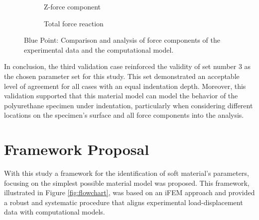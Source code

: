 \begin{figure}[htbp]
\begin{subfigure}[b]{0.45\textwidth}
    \caption{Z-force component}
    \end{subfigure}  
    \hspace{0.3cm}
    \begin{subfigure}[b]{0.45\textwidth}
    \centering
    \caption{Total force reaction}
    \end{subfigure}
    
    \caption[Blue point force components comparison]{Blue Point: Comparison and analysis of force components of the experimental data and the computational model.}
    \label{fig:bpforcecompvc}
\end{figure}

In conclusion, the third validation case reinforced the validity of set number
\SI{3}{} as the chosen parameter set for this study. This set 
demonstrated an acceptable level of agreement for all cases with an equal 
indentation depth. Moreover, this validation supported that this material model 
can model the behavior of the polyurethane specimen under indentation, particularly
when considering different locations on the specimen's surface and all 
force components into the analysis.
\section{Framework Proposal}
With this study a framework for the identification of soft material's parameters, focusing on the 
simplest possible material model was proposed. This framework, illustrated in Figure \ref{fig:flowchart}, 
was based on an iFEM approach and provided a robust and systematic procedure that aligns experimental 
load-displacement data with computational models.\\

